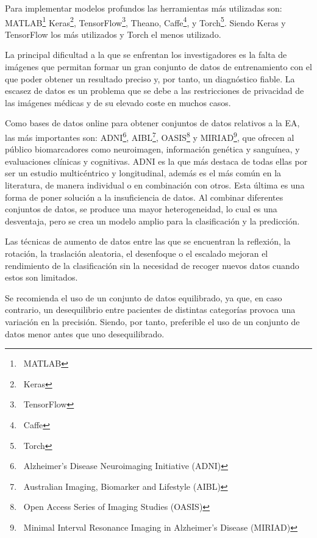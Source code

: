 Para implementar modelos profundos las herramientas más utilizadas son:
MATLAB\footnote{~\cite{matlab}{MATLAB}}
Keras\footnote{~\cite{keras}{Keras}},
TensorFlow\footnote{~\cite{tensorflow}{TensorFlow}},
Theano,
Caffe\footnote{~\cite{caffe}{Caffe}},
y Torch\footnote{~\cite{torch}{Torch}}.
Siendo Keras y TensorFlow los más utilizados y Torch el menos utilizado.

La principal dificultad a la que se enfrentan los investigadores es la falta de imágenes que permitan formar un gran
conjunto de datos de entrenamiento con el que poder obtener un resultado preciso y, por tanto, un diagnóstico fiable.
La escasez de datos es un problema que se debe a las restricciones de privacidad de las imágenes médicas y de su elevado
coste en muchos casos.

Como bases de datos online para obtener conjuntos de datos relativos a la EA, las más importantes son:
ADNI\footnote{~\cite{adni}{Alzheimer’s Disease Neuroimaging Initiative (ADNI)}},
AIBL\footnote{~\cite{aibl}{Australian Imaging, Biomarker and Lifestyle (AIBL)}},
OASIS\footnote{~\cite{oasis}{Open Access Series of Imaging Studies (OASIS)}}
y MIRIAD\footnote{~\cite{miriad}{Minimal Interval Resonance Imaging in Alzheimer's Disease (MIRIAD)}},
que ofrecen al público biomarcadores como neuroimagen, información genética y sanguínea, y evaluaciones
clínicas y cognitivas.
ADNI es la que más destaca de todas ellas por ser un estudio multicéntrico y longitudinal, además es el más común en la
literatura, de manera individual o en combinación con otros.
Esta última es una forma de poner solución a la insuficiencia de datos.
Al combinar diferentes conjuntos de datos, se produce una mayor heterogeneidad, lo cual es una desventaja, pero se crea
un modelo amplio para la clasificación y la predicción.

Las técnicas de aumento de datos entre las que se encuentran la reflexión, la rotación, la traslación aleatoria, el
desenfoque o el escalado mejoran el rendimiento de la clasificación sin la necesidad de recoger nuevos datos cuando
estos son limitados.

Se recomienda el uso de un conjunto de datos equilibrado, ya que, en caso contrario, un desequilibrio entre pacientes de
distintas categorías provoca una variación en la precisión.
Siendo, por tanto, preferible el uso de un conjunto de datos menor antes que uno desequilibrado.